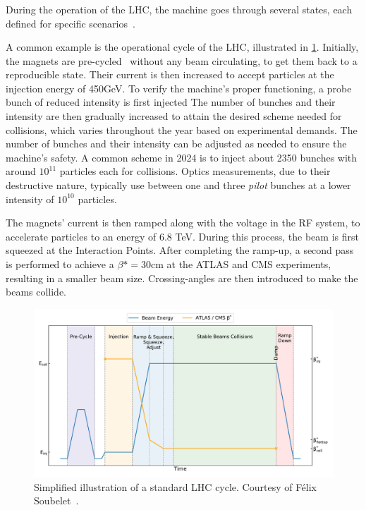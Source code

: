 \subsubsection{}

During the operation of the LHC, the machine goes through several states, each defined for specific 
scenarios~\cite{wenniger_lhc_2019}.

A common example is the operational cycle of the LHC, illustrated in \cref{fig:cern_complex:cycle}.
Initially, the magnets are pre-cycled~\cite{bottura_pre-cycles_2010} without any beam circulating,
to get them back to a reproducible state. Their current is then increased to accept particles at the
injection energy of 450GeV.  To verify the machine's proper functioning, a probe bunch of reduced
intensity is first injected The number of bunches and their intensity are then gradually increased
to attain the desired scheme needed for collisions, which varies throughout the year based on
experimental demands. The number of bunches and their intensity can be adjusted as needed to ensure
the machine's safety. A common scheme in 2024 is to inject about 2350 bunches with around $10^{11}$
particles each for collisions.  Optics measurements, due to their destructive nature, typically use
between one and three \textit{pilot} bunches at a lower intensity of $10^{10}$ particles.

The magnets' current is then ramped along with the voltage in the RF system, to accelerate particles
to an energy of 6.8 TeV. During this process, the beam is first squeezed at the Interaction Points.
After completing the ramp-up, a second pass is performed to achieve a $\beta* = 30$cm at the ATLAS
and CMS experiments, resulting in a smaller beam size. Crossing-angles are then introduced to make
the beams collide.

\begin{figure}[!htb]
    \includegraphics[width=\textwidth]{./images/lhc_cycle.pdf}
    \caption{Simplified illustration of a standard LHC cycle. Courtesy of Félix
    Soubelet~\cite{felix_soubelet_local_2023}.}
    \label{fig:cern_complex:cycle}
\end{figure}